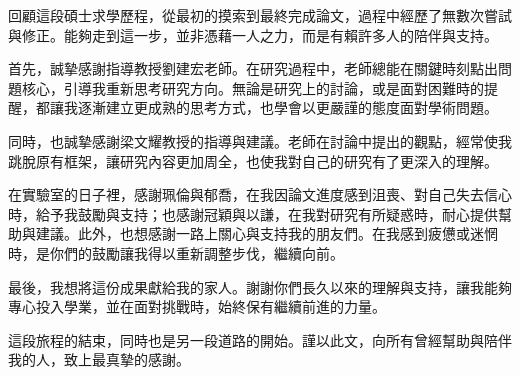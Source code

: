 \begin{Thanks}
    回顧這段碩士求學歷程，從最初的摸索到最終完成論文，過程中經歷了無數次嘗試與修正。能夠走到這一步，並非憑藉一人之力，而是有賴許多人的陪伴與支持。

    首先，誠摯感謝指導教授劉建宏老師。在研究過程中，老師總能在關鍵時刻點出問題核心，引導我重新思考研究方向。無論是研究上的討論，或是面對困難時的提醒，都讓我逐漸建立更成熟的思考方式，也學會以更嚴謹的態度面對學術問題。

    同時，也誠摯感謝梁文耀教授的指導與建議。老師在討論中提出的觀點，經常使我跳脫原有框架，讓研究內容更加周全，也使我對自己的研究有了更深入的理解。

    在實驗室的日子裡，感謝珮倫與郁喬，在我因論文進度感到沮喪、對自己失去信心時，給予我鼓勵與支持；也感謝冠穎與以謙，在我對研究有所疑惑時，耐心提供幫助與建議。此外，也想感謝一路上關心與支持我的朋友們。在我感到疲憊或迷惘時，是你們的鼓勵讓我得以重新調整步伐，繼續向前。

    最後，我想將這份成果獻給我的家人。謝謝你們長久以來的理解與支持，讓我能夠專心投入學業，並在面對挑戰時，始終保有繼續前進的力量。

    這段旅程的結束，同時也是另一段道路的開始。謹以此文，向所有曾經幫助與陪伴我的人，致上最真摯的感謝。

\end{Thanks}
